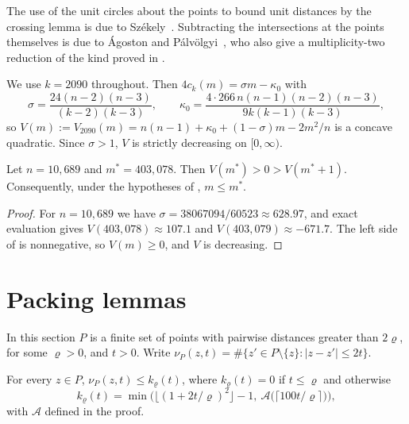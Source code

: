 \documentclass[11pt,colorlinks]{charlie}
\begin{document}
The use of the unit circles about the points to bound unit distances by the crossing lemma is due to Székely~\cite{Szekely}. Subtracting the intersections at the points themselves is due to Ágoston and Pálvölgyi~\cite{AP}, who also give a multiplicity-two reduction of the kind proved in .

We use $k=2090$ throughout. Then $4c_k(m)=\sigma m-\kappa_0$ with
\[
 \sigma=\frac{24(n-2)(n-3)}{(k-2)(k-3)},\qquad \kappa_0=\frac{4\cdot266\,n(n-1)(n-2)(n-3)}{9k(k-1)(k-3)},
\]
so $V(m):=V_{2090}(m)=n(n-1)+\kappa_0+(1-\sigma)m-2m^2/n$ is a concave quadratic. Since $\sigma>1$, $V$ is strictly decreasing on $[0,\infty)$.

\begin{corollary}\label{cor:ceiling}
Let $n=10{,}689$ and $m^*=403{,}078$. Then $V(m^*)>0>V(m^*+1)$. Consequently, under the hypotheses of , $m\le m^*$.
\end{corollary}
\begin{proof}
For $n=10{,}689$ we have $\sigma=38067094/60523\approx628.97$, and exact evaluation gives $V(403{,}078)\approx107.1$ and $V(403{,}079)\approx-671.7$. The left side of  is nonnegative, so $V(m)\ge0$, and $V$ is decreasing.
\end{proof}

\section{Packing lemmas}\label{sec:packing}

In this section $P$ is a finite set of points with pairwise distances greater than $2\varrho$, for some $\varrho>0$, and $t>0$. Write $\nu_P(z,t)=\#\{z'\in P\setminus\{z\}:|z-z'|\le2t\}$.

\begin{lemma}\label{lem:pointwise}
For every $z\in P$, $\nu_P(z,t)\le k_\varrho(t)$, where $k_\varrho(t)=0$ if $t\le\varrho$ and otherwise
\[
 k_\varrho(t)=\min\Big(\big\lfloor(1+2t/\varrho)^2\big\rfloor-1,\ \mathcal A\big(\lceil100t/\varrho\rceil\big)\Big),
\]
with $\mathcal A$ defined in the proof.
\end{lemma}
\end{document}
